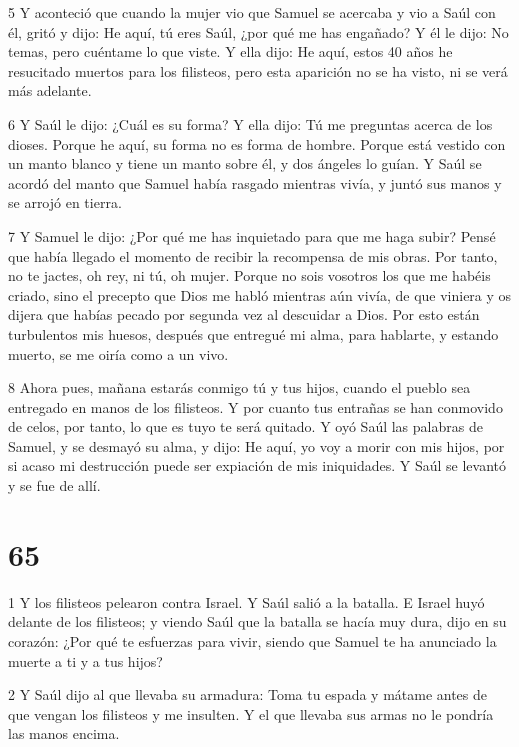 \par 5 Y aconteció que cuando la mujer vio que Samuel se acercaba y vio a Saúl con él, gritó y dijo: He aquí, tú eres Saúl, ¿por qué me has engañado? Y él le dijo: No temas, pero cuéntame lo que viste. Y ella dijo: He aquí, estos 40 años he resucitado muertos para los filisteos, pero esta aparición no se ha visto, ni se verá más adelante.

\par 6 Y Saúl le dijo: ¿Cuál es su forma? Y ella dijo: Tú me preguntas acerca de los dioses. Porque he aquí, su forma no es forma de hombre. Porque está vestido con un manto blanco y tiene un manto sobre él, y dos ángeles lo guían. Y Saúl se acordó del manto que Samuel había rasgado mientras vivía, y juntó sus manos y se arrojó en tierra.

\par 7 Y Samuel le dijo: ¿Por qué me has inquietado para que me haga subir? Pensé que había llegado el momento de recibir la recompensa de mis obras. Por tanto, no te jactes, oh rey, ni tú, oh mujer. Porque no sois vosotros los que me habéis criado, sino el precepto que Dios me habló mientras aún vivía, de que viniera y os dijera que habías pecado por segunda vez al descuidar a Dios. Por esto están turbulentos mis huesos, después que entregué mi alma, para hablarte, y estando muerto, se me oiría como a un vivo.

\par 8 Ahora pues, mañana estarás conmigo tú y tus hijos, cuando el pueblo sea entregado en manos de los filisteos. Y por cuanto tus entrañas se han conmovido de celos, por tanto, lo que es tuyo te será quitado. Y oyó Saúl las palabras de Samuel, y se desmayó su alma, y ​​dijo: He aquí, yo voy a morir con mis hijos, por si acaso mi destrucción puede ser expiación de mis iniquidades. Y Saúl se levantó y se fue de allí.

\chapter{65}

\par 1 Y los filisteos pelearon contra Israel. Y Saúl salió a la batalla. E Israel huyó delante de los filisteos; y viendo Saúl que la batalla se hacía muy dura, dijo en su corazón: ¿Por qué te esfuerzas para vivir, siendo que Samuel te ha anunciado la muerte a ti y a tus hijos?

\par 2 Y Saúl dijo al que llevaba su armadura: Toma tu espada y mátame antes de que vengan los filisteos y me insulten. Y el que llevaba sus armas no le pondría las manos encima.

